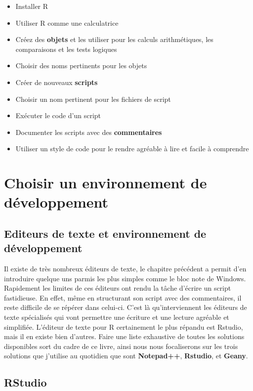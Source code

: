 \documentclass[]{book}
\providecommand{\tightlist}{%
  \setlength{\itemsep}{0pt}\setlength{\parskip}{0pt}}
\theoremstyle{definition}
\theoremstyle{definition}
\theoremstyle{definition}
\theoremstyle{remark}
\begin{document}
\begin{itemize}
\tightlist
\item
  Installer R
\item
  Utiliser R comme une calculatrice
\item
  Créez des \textbf{objets} et les utiliser pour les calculs
  arithmétiques, les comparaisons et les tests logiques
\item
  Choisir des noms pertinents pour les objets
\item
  Créer de nouveaux \textbf{scripts}
\item
  Choisir un nom pertinent pour les fichiers de script
\item
  Exécuter le code d'un script
\item
  Documenter les scripts avec des \textbf{commentaires}
\item
  Utiliser un style de code pour le rendre agréable à lire et facile à
  comprendre
\end{itemize}

\hypertarget{IDE}{\chapter{Choisir un environnement de
développement}\label{IDE}}

\section{Editeurs de texte et environnement de
développement}\label{editeurs-de-texte-et-environnement-de-developpement}

Il existe de très nombreux éditeurs de texte, le chapitre précédent a
permit d'en introduire quelque uns parmis les plus simples comme le bloc
note de Windows. Rapidement les limites de ces éditeurs ont rendu la
tâche d'écrire un script fastidieuse. En effet, même en structurant son
script avec des commentaires, il reste difficile de se répérer dans
celui-ci. C'est là qu'interviennent les éditeurs de texte spécialisés
qui vont permettre une écriture et une lecture agréable et simplifiée.
L'éditeur de texte pour R certainement le plus répandu est Rstudio, mais
il en existe bien d'autres. Faire une liste exhaustive de toutes les
solutions disponibles sort du cadre de ce livre, ainsi nous nous
focaliserons sur les trois solutions que j'utilise au quotidien que sont
\textbf{Notepad++}, \textbf{Rstudio}, et \textbf{Geany}.

\section{RStudio}\label{rstudio}
\end{document}
